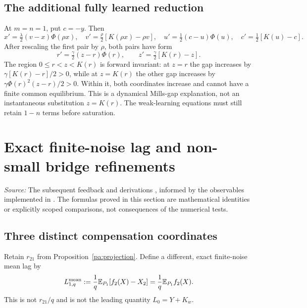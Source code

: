 \documentclass[11pt]{article}
\numberwithin{equation}{section}
\theoremstyle{definition}
\theoremstyle{remark}
\newcommand{\E}{\mathbb E}
\newcommand{\1}{\mathbf 1}
\newcommand{\source}[1]{\par\noindent\textit{Source:} #1\par\smallskip}
\begin{document}
\subsection{The additional fully learned reduction}
At $m=n=1$, put $c=-y$. Then
\[
 x'=\tfrac\lambda2(v-x)\Phi(\rho x),\quad
 v'=\tfrac\rho2[K(\rho x)-\rho v],\quad
 u'=\tfrac12(c-u)\Phi(u),\quad c'=\tfrac12[K(u)-c].
\]
After rescaling the first pair by $\rho$, both pairs have form
\[
 r'=\tfrac\gamma2(z-r)\Phi(r),\qquad
 z'=\tfrac\gamma2[K(r)-z].
\]
The region $0\le r<z<K(r)$ is forward invariant: at $z=r$ the gap
increases by $\gamma[K(r)-r]/2>0$, while at $z=K(r)$ the other gap
increases by $\gamma\Phi(r)^2(z-r)/2>0$. Within it, both coordinates
increase and cannot have a finite common equilibrium. This is a dynamical
Mills-gap explanation, not an instantaneous substitution $z=K(r)$.
The weak-learning equations must still retain $1-n$ terms before saturation.

\section{Exact finite-noise lag and non-small bridge refinements}
\label{pa:finiteq}
\source{The subsequent feedback and derivations \cite{C}, informed by the
observables implemented in \cite{D}. The formulas proved in this section
are mathematical identities or explicitly scoped comparisons, not consequences
of the numerical tests.}

\subsection{Three distinct compensation coordinates}
Retain $r_{21}$ from Proposition~\ref{pa:projection}. Define a different,
exact finite-noise mean lag by
\begin{equation}\label{pa:Lexdef}
 L_{1,q}^{\rm mean}:=\frac1q\E_{P_1}[f_2(X)-X_2]
 =\frac1q\E_{P_1}f_2(X).
\end{equation}
This is not $r_{21}/q$ and is not the leading quantity $L_0=Y+K_w$.
\end{document}
